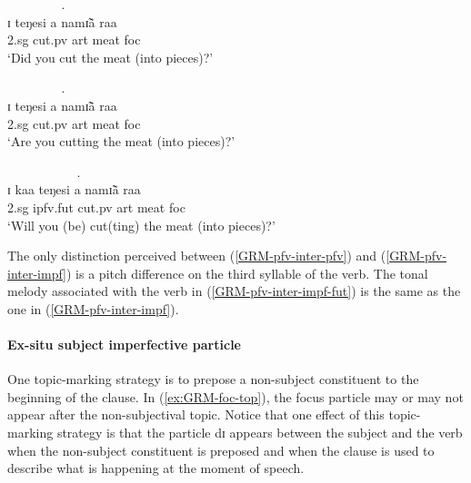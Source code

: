 \begin{exe}
\begin{exe}
\begin{exe}
{\begin{exe}
\begin{exe}
\begin{exe}
\begin{exe}
\begin{exe}
\begin{exe}
\begin{exe}
\begin{exe}
\begin{exe}
\begin{exe}
\begin{exe}
\begin{exe}
\begin{exe}
\begin{exe}
\begin{exe}
\begin{exe}
\begin{exe}
\begin{exe}
\begin{exe}
\ea\label{GRM-pfv-inter-pfv}
 {\T    } {\T   } {\T    } {\T   }.\\
 ɪ   teŋesi  a  namɪ̃ã  raa\\
    {\sc 2.sg} {cut.{\sc pv}} {\sc art} {meat} {\sc foc}\\
\glt `Did you cut the meat (into pieces)?'\\



\ex\label{GRM-pfv-inter-impf}

 {\T     } {\T } {\T    } {\T   }.\\
ɪ   teŋesi  a  namɪ̃ã  raa\\
    {\sc 2.sg} {cut.{\sc pv}} {\sc art} {meat} {\sc foc}\\
\glt `Are you cutting the meat (into pieces)?'\\


\ex\label{GRM-pfv-inter-impf-fut}

 {\T    } {\T     } {\T } {\T    } {\T   }.\\
ɪ  kaa teŋesi  a  namɪ̃ã  raa\\
    {\sc 2.sg} {\sc ipfv.fut} {cut.{\sc pv}} {\sc art} {meat} {\sc foc}\\
\glt  `Will you (be) cut(ting) the meat (into pieces)?'\\
 
\z 
 \z

The only distinction perceived between (\ref{GRM-pfv-inter-pfv})  and
(\ref{GRM-pfv-inter-impf}) is a pitch difference on the third syllable of the
verb. The tonal melody associated with the verb in 
(\ref{GRM-pfv-inter-impf-fut}) is the
same as the one in (\ref{GRM-pfv-inter-impf}).



\paragraph{Ex-situ subject imperfective particle}
\label{sec:GRM-ipfv-part}

One topic-marking strategy is to prepose a non-subject constituent to the
beginning of the clause.  In  (\ref{ex:GRM-foc-top}),  the focus particle may or
may not
appear after the non-subjectival topic. Notice that one effect of this 
topic-marking strategy is that the particle {\sls dɪ} appears between the 
subject
and
the verb when the non-subject constituent is preposed and when the clause is
used to describe what is happening at the moment of speech. \nolinebreak


\end{exe}
\end{exe}
\end{exe}
\end{exe}
\end{exe}
\end{exe}
\end{exe}
\end{exe}
\end{exe}
\end{exe}
\end{exe}
\end{exe}
\end{exe}
\end{exe}
\end{exe}
\end{exe}
\end{exe}
\end{exe}
\end{exe}}
\end{exe}
\end{exe}
\end{exe}
